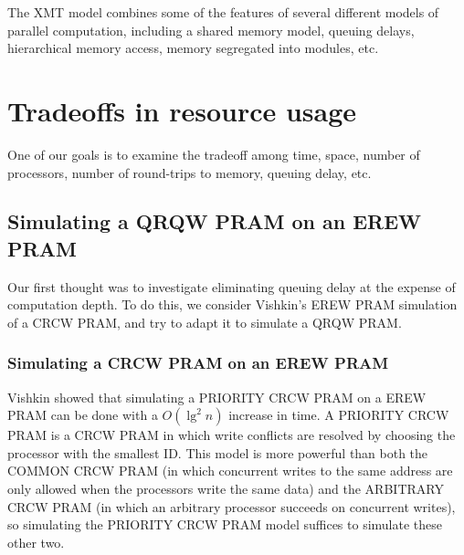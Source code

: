 \documentclass{article}
\begin{document}
The XMT model combines some of the features of several different models of parallel computation, including a shared memory model, queuing delays, hierarchical memory access, memory segregated into modules, etc.

\section{Tradeoffs in resource usage}

One of our goals is to examine the tradeoff among time, space, number of processors, number of round-trips to memory, queuing delay, etc.

\subsection{Simulating a QRQW PRAM on an EREW PRAM}

Our first thought was to investigate eliminating queuing delay at the expense of computation depth.
To do this, we consider Vishkin's EREW PRAM simulation of a CRCW PRAM, and try to adapt it to simulate a QRQW PRAM.

\subsubsection{Simulating a CRCW PRAM on an EREW PRAM}

Vishkin showed that simulating a PRIORITY CRCW PRAM on a EREW PRAM can be done with a $O(\lg^2 n)$ increase in time.
A PRIORITY CRCW PRAM is a CRCW PRAM in which write conflicts are resolved by choosing the processor with the smallest ID.
This model is more powerful than both the COMMON CRCW PRAM (in which concurrent writes to the same address are only allowed when the processors write the same data) and the ARBITRARY CRCW PRAM (in which an arbitrary processor succeeds on concurrent writes), so simulating the PRIORITY CRCW PRAM model suffices to simulate these other two.
\end{document}

